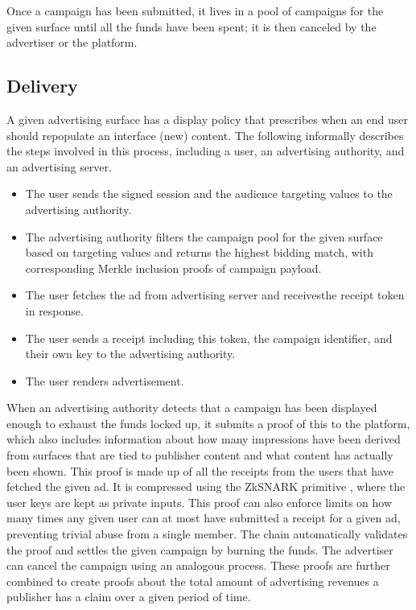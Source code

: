 \documentclass{article}
\begin{document}
Once a campaign has been submitted, it lives in a pool of campaigns for the given surface until all the funds have been spent; it is then canceled by the advertiser or the platform.

\subsection{Delivery}


A given advertising surface has a display policy that prescribes when an end user should repopulate an interface (new) content. The following informally describes the steps involved in this process, including a user, an advertising authority, and an advertising server.

\begin{itemize}
 \item The user sends the signed session and the audience targeting values to the advertising authority.
 \item The advertising authority filters the campaign pool for the given surface based on targeting values and returns the highest bidding match, with corresponding Merkle inclusion proofs of campaign payload.
 \item The user fetches the ad from advertising server and receivesthe  receipt token in response.
 \item The user sends a receipt including this token, the campaign identifier, and their own key to the advertising authority.
 \item The user renders advertisement.
\end{itemize}

When an advertising authority detects that a campaign has been displayed enough to exhaust the funds locked up, it submits a proof of this to the platform, which also includes information about how many impressions have been derived from surfaces that are tied to publisher content and what content has actually been shown. This proof is made up of all the receipts from the users that have fetched the given ad. It is compressed using the ZkSNARK primitive \cite{ben2014succinct}, where the user keys are kept as private inputs. This proof can also enforce limits on how many times any given user can at most have submitted a receipt for a given ad, preventing trivial abuse from a single member. The chain automatically validates the proof and settles the given campaign by burning the funds. The advertiser can cancel the campaign using an analogous process. These proofs are further combined to create proofs about the total amount of advertising revenues a publisher has a claim over a given period of time.
\end{document}
